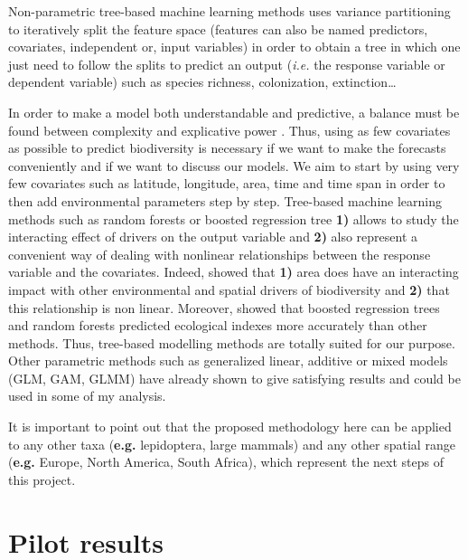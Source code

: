 \documentclass[
  12pt,
  oneside]{report}
\begin{document}
Non-parametric tree-based machine learning methods uses variance partitioning to iteratively split
the feature space (features can also be named predictors, covariates, independent or, input variables)
in order to obtain a tree in which one just need to follow the splits to predict an output (\emph{i.e.} the
response variable or dependent variable) such as species richness, colonization, extinction\ldots{}

In order to make a model both understandable and predictive, a balance must be found between
complexity and explicative power \autocite{houlahan_priority_2017}. Thus, using as few covariates as possible to
predict biodiversity is necessary if we want to make the forecasts conveniently and if we want to
discuss our models. We aim to start by using very few covariates such as latitude, longitude, area,
time and time span in order to then add environmental parameters step by step. Tree-based machine
learning methods such as random forests or boosted regression tree \textbf{1)} allows to study the interacting
effect of drivers on the output variable and \textbf{2)} also represent a convenient way of dealing with nonlinear
relationships between the response variable and the covariates. Indeed, \textcite{keil_global_2019}
showed that \textbf{1)} area does have an interacting impact with other environmental and spatial drivers of
biodiversity and \textbf{2)} that this relationship is non linear. Moreover, \textcite{viana_partitioning_2019} showed that
boosted regression trees and random forests predicted ecological indexes more accurately than other
methods. Thus, tree-based modelling methods are totally suited for our purpose. Other parametric
methods such as generalized linear, additive or mixed models (GLM, GAM, GLMM) have already shown
to give satisfying results \autocite{keil_global_2019} and could be used in some of my analysis.

It is important to point out that the proposed methodology here can be applied to any other taxa (\textbf{e.g.}
lepidoptera, large mammals) and any other spatial range (\textbf{e.g.} Europe, North America, South Africa),
which represent the next steps of this project.

\hypertarget{pilot-results}{%
\section{Pilot results}\label{pilot-results}}
\end{document}
